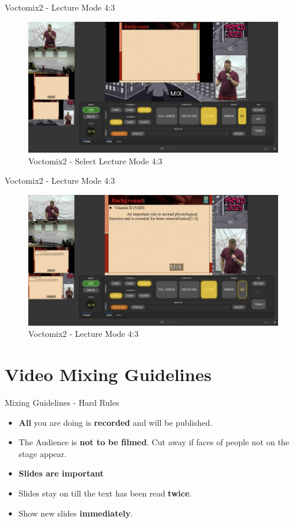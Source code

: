 \begin{frame}{Voctomix2 - Lecture Mode 4:3}
	\begin{figure} 
		\centering
		\includegraphics[width=.9\textwidth]{images/voctomix2-lecture_43_select.jpg}
		\caption{Voctomix2 - Select Lecture Mode 4:3}
	\end{figure}
\end{frame}

\begin{frame}{Voctomix2 - Lecture Mode 4:3}
	\begin{figure} 
		\centering
		\includegraphics[width=.9\textwidth]{images/voctomix2-lecture_43.jpg}
		\caption{Voctomix2 - Lecture Mode 4:3}
	\end{figure}
\end{frame}

\section{Video Mixing Guidelines}
\begin{frame}{Mixing Guidelines - Hard Rules}
	\begin{itemize}
		\item \textbf{All} you are doing is \textbf{recorded} and will be published.
		\item The Audience is \textbf{not to be filmed}. Cut away if faces of people not on the stage appear.
		\item \textbf{Slides are important}
		\item Slides stay on till the text has been read \textbf{twice}.
		\item Show new slides \textbf{immediately}.
	\end{itemize}
\end{frame}


